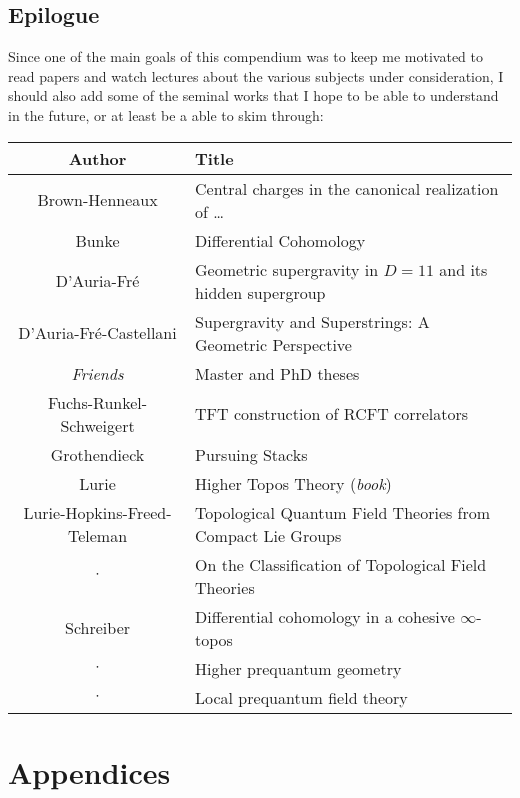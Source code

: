 \documentclass[11pt, a4paper]{report}
\begin{document}
\chapter{Epilogue}

    Since one of the main goals of this compendium was to keep me motivated to read papers and watch lectures about the various subjects under consideration, I should also add some of the seminal works that I hope to be able to understand  in the future, or at least be a able to skim through:

    \begin{center}
        \begin{tabular}{|c|l|}
            \hline
            Author&Title\\
            \hline
            Brown-Henneaux&Central charges in the canonical realization of \ldots\\
			Bunke&Differential Cohomology\\
			D'Auria-Fr\'e&Geometric supergravity in $D=11$ and its hidden supergroup\\
			D'Auria-Fr\'e-Castellani&Supergravity and Superstrings: A Geometric Perspective\\
            \textit{Friends}&Master and PhD theses\\
            Fuchs-Runkel-Schweigert&TFT construction of RCFT correlators\\
            Grothendieck&Pursuing Stacks\\
            Lurie&Higher Topos Theory (\textit{book})\\
            Lurie-Hopkins-Freed-Teleman&Topological Quantum Field Theories from Compact Lie Groups\\
            $\cdot$&On the Classification of Topological Field Theories\\
            Schreiber&Differential cohomology in a cohesive $\infty$-topos\\
            $\cdot$&Higher prequantum geometry\\
            $\cdot$&Local prequantum field theory\\
            \hline
        \end{tabular}
    \end{center}

\part{Appendices}
\begin{appendices}


\end{appendices}
\end{document}
